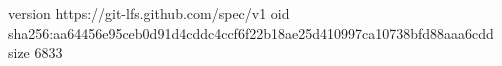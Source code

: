 version https://git-lfs.github.com/spec/v1
oid sha256:aa64456e95ceb0d91d4cddc4ccf6f22b18ae25d410997ca10738bfd88aaa6cdd
size 6833
